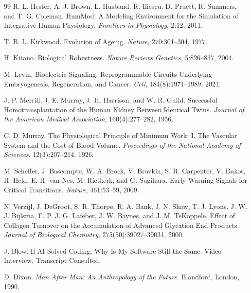 \documentclass[11pt,openany]{book}
\theoremstyle{definition}
\theoremstyle{remark}
\begin{document}
\begin{thebibliography}{99}
 R. L. Hester, A. J. Brown, L. Husband, R. Iliescu, D. Pruett, R. Summers, and T. G. Coleman. HumMod: A Modeling Environment for the Simulation of Integrative Human Physiology. \emph{Frontiers in Physiology}, 2:12, 2011.

 T. B. L. Kirkwood. Evolution of Ageing. \emph{Nature}, 270:301--304, 1977.

 H. Kitano. Biological Robustness. \emph{Nature Reviews Genetics}, 5:826--837, 2004.

 M. Levin. Bioelectric Signaling: Reprogrammable Circuits Underlying Embryogenesis, Regeneration, and Cancer. \emph{Cell}, 184(8):1971--1989, 2021.

 J. P. Merrill, J. E. Murray, J. H. Harrison, and W. R. Guild. Successful Homotransplantation of the Human Kidney Between Identical Twins. \emph{Journal of the American Medical Association}, 160(4):277--282, 1956.

 C. D. Murray. The Physiological Principle of Minimum Work: I. The Vascular System and the Cost of Blood Volume. \emph{Proceedings of the National Academy of Sciences}, 12(3):207--214, 1926.

 M. Scheffer, J. Bascompte, W. A. Brock, V. Brovkin, S. R. Carpenter, V. Dakos, H. Held, E. H. van Nes, M. Rietkerk, and G. Sugihara. Early-Warning Signals for Critical Transitions. \emph{Nature}, 461:53--59, 2009.

 N. Verzijl, J. DeGroot, S. R. Thorpe, R. A. Bank, J. N. Shaw, T. J. Lyons, J. W. J. Bijlsma, F. P. J. G. Lafeber, J. W. Baynes, and J. M. TeKoppele. Effect of Collagen Turnover on the Accumulation of Advanced Glycation End Products. \emph{Journal of Biological Chemistry}, 275(50):39027--39031, 2000.

 J. Blow. If AI Solved Coding, Why Is My Software Still the Same. Video Interview, Transcript Consulted.

 D. Dixon. \emph{Man After Man: An Anthropology of the Future}. Blandford, London, 1990.

\end{thebibliography}
\end{document}
